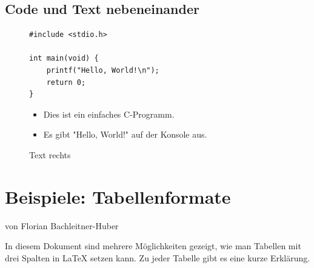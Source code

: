 \documentclass[twoside]{scrreprt}
\begin{document}
\subsection{Code und Text nebeneinander}  %
\begin{figure}[!h]  %

  \centering  %
  \begin{minipage}[b]{0.55\textwidth}  %
    \centering  %
\begin{lstlisting}[style=cstyle]
#include <stdio.h>

int main(void) {
    printf("Hello, World!\n");
    return 0;
}
\end{lstlisting}
    \caption{Code links}  %
  \end{minipage}
  \begin{minipage}[b]{0.4\textwidth}  %
    \centering  %
    \begin{itemize}  %
      \item Dies ist ein einfaches C-Programm.  %
      \item Es gibt "Hello, World!" auf der Konsole aus.  %
    \end{itemize}
    \caption{Text rechts}  %
  \end{minipage}
\end{figure}



\newpage

\section{Beispiele: Tabellenformate}
{\large von Florian Bachleitner-Huber}

\vspace{1 cm}

In diesem Dokument sind mehrere Möglichkeiten gezeigt, wie man Tabellen mit drei Spalten in LaTeX setzen kann. Zu jeder Tabelle gibt es eine kurze Erklärung.
\end{document}
